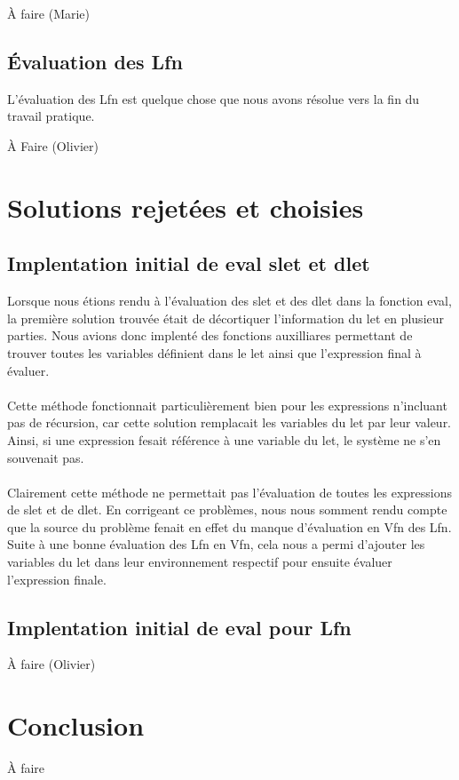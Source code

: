 \documentclass[12pt, letterpaper]{article}
\begin{document}
À faire (Marie)

\subsection*{Évaluation des Lfn}
L'évaluation des Lfn est quelque chose que nous avons résolue vers la fin du
travail pratique.

À Faire (Olivier)

\section*{Solutions rejetées et choisies}

\subsection*{Implentation initial de eval slet et dlet}

Lorsque nous étions rendu à l'évaluation des slet et des dlet dans la fonction
eval, la première solution trouvée était de décortiquer l'information du let
en plusieur parties. Nous avions donc implenté des fonctions auxilliares
permettant de trouver toutes les variables définient dans le let ainsi que
l'expression final à évaluer.
\\
\\
Cette méthode fonctionnait particulièrement bien pour les expressions n'incluant
pas de récursion, car cette solution remplacait les variables du let par leur
valeur. Ainsi, si une expression fesait référence à une variable du let, le
système ne s'en souvenait pas.
\\
\\
Clairement cette méthode ne permettait pas l'évaluation de toutes les
expressions de slet et de dlet. En corrigeant ce problèmes, nous nous somment
rendu compte que la source du problème fenait en effet du manque d'évaluation
en Vfn des Lfn. Suite à une bonne évaluation des Lfn en Vfn, cela nous a permi
d'ajouter les variables du let dans leur environnement respectif pour ensuite
évaluer l'expression finale.

\subsection*{Implentation initial de eval pour Lfn}

À faire (Olivier)

\section*{Conclusion}

À faire
\end{document}
